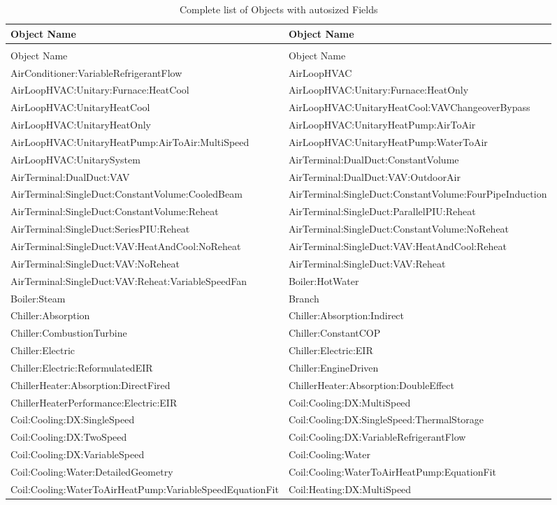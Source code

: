 \begin{longtable}[c]{p{3.02in}p{2.97in}}
\caption{Complete list of Objects with autosized Fields \label{table:complete-list-of-objects-with-autosized}} \tabularnewline
\toprule
Object Name & Object Name \tabularnewline
\midrule
\endfirsthead

\caption[]{Complete list of Objects with autosized Fields} \tabularnewline
\toprule
Object Name & Object Name \tabularnewline
\midrule
\endhead

AirConditioner:VariableRefrigerantFlow & AirLoopHVAC \tabularnewline
AirLoopHVAC:Unitary:Furnace:HeatCool & AirLoopHVAC:Unitary:Furnace:HeatOnly \tabularnewline
AirLoopHVAC:UnitaryHeatCool & AirLoopHVAC:UnitaryHeatCool:VAVChangeoverBypass \tabularnewline
AirLoopHVAC:UnitaryHeatOnly & AirLoopHVAC:UnitaryHeatPump:AirToAir \tabularnewline
AirLoopHVAC:UnitaryHeatPump:AirToAir:MultiSpeed & AirLoopHVAC:UnitaryHeatPump:WaterToAir \tabularnewline
AirLoopHVAC:UnitarySystem & AirTerminal:DualDuct:ConstantVolume \tabularnewline
AirTerminal:DualDuct:VAV & AirTerminal:DualDuct:VAV:OutdoorAir \tabularnewline
AirTerminal:SingleDuct:ConstantVolume:CooledBeam & AirTerminal:SingleDuct:ConstantVolume:FourPipeInduction \tabularnewline
AirTerminal:SingleDuct:ConstantVolume:Reheat & AirTerminal:SingleDuct:ParallelPIU:Reheat \tabularnewline
AirTerminal:SingleDuct:SeriesPIU:Reheat & AirTerminal:SingleDuct:ConstantVolume:NoReheat \tabularnewline
AirTerminal:SingleDuct:VAV:HeatAndCool:NoReheat & AirTerminal:SingleDuct:VAV:HeatAndCool:Reheat \tabularnewline
AirTerminal:SingleDuct:VAV:NoReheat & AirTerminal:SingleDuct:VAV:Reheat \tabularnewline
AirTerminal:SingleDuct:VAV:Reheat:VariableSpeedFan & Boiler:HotWater \tabularnewline
Boiler:Steam & Branch \tabularnewline
Chiller:Absorption & Chiller:Absorption:Indirect \tabularnewline
Chiller:CombustionTurbine & Chiller:ConstantCOP \tabularnewline
Chiller:Electric & Chiller:Electric:EIR \tabularnewline
Chiller:Electric:ReformulatedEIR & Chiller:EngineDriven \tabularnewline
ChillerHeater:Absorption:DirectFired & ChillerHeater:Absorption:DoubleEffect \tabularnewline
ChillerHeaterPerformance:Electric:EIR & Coil:Cooling:DX:MultiSpeed \tabularnewline
Coil:Cooling:DX:SingleSpeed & Coil:Cooling:DX:SingleSpeed:ThermalStorage \tabularnewline
Coil:Cooling:DX:TwoSpeed & Coil:Cooling:DX:VariableRefrigerantFlow \tabularnewline
Coil:Cooling:DX:VariableSpeed & Coil:Cooling:Water \tabularnewline
Coil:Cooling:Water:DetailedGeometry & Coil:Cooling:WaterToAirHeatPump:EquationFit \tabularnewline
Coil:Cooling:WaterToAirHeatPump:VariableSpeedEquationFit & Coil:Heating:DX:MultiSpeed \tabularnewline

\end{longtable}
